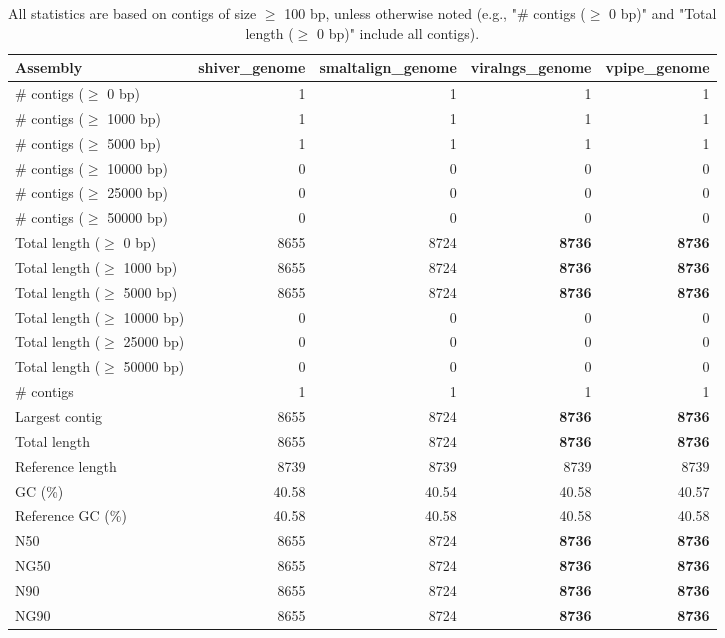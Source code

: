 \documentclass[12pt,a4paper]{article}
\begin{document}
\begin{table}[ht]
\begin{center}
\caption{All statistics are based on contigs of size $\geq$ 100 bp, unless otherwise noted (e.g., "\# contigs ($\geq$ 0 bp)" and "Total length ($\geq$ 0 bp)" include all contigs).}
\begin{tabular}{|l*{4}{|r}|}
\hline
Assembly & shiver\_genome & smaltalign\_genome & viralngs\_genome & vpipe\_genome \\ \hline
\# contigs ($\geq$ 0 bp) & 1 & 1 & 1 & 1 \\ \hline
\# contigs ($\geq$ 1000 bp) & 1 & 1 & 1 & 1 \\ \hline
\# contigs ($\geq$ 5000 bp) & 1 & 1 & 1 & 1 \\ \hline
\# contigs ($\geq$ 10000 bp) & 0 & 0 & 0 & 0 \\ \hline
\# contigs ($\geq$ 25000 bp) & 0 & 0 & 0 & 0 \\ \hline
\# contigs ($\geq$ 50000 bp) & 0 & 0 & 0 & 0 \\ \hline
Total length ($\geq$ 0 bp) & 8655 & 8724 & {\bf 8736} & {\bf 8736} \\ \hline
Total length ($\geq$ 1000 bp) & 8655 & 8724 & {\bf 8736} & {\bf 8736} \\ \hline
Total length ($\geq$ 5000 bp) & 8655 & 8724 & {\bf 8736} & {\bf 8736} \\ \hline
Total length ($\geq$ 10000 bp) & 0 & 0 & 0 & 0 \\ \hline
Total length ($\geq$ 25000 bp) & 0 & 0 & 0 & 0 \\ \hline
Total length ($\geq$ 50000 bp) & 0 & 0 & 0 & 0 \\ \hline
\# contigs & 1 & 1 & 1 & 1 \\ \hline
Largest contig & 8655 & 8724 & {\bf 8736} & {\bf 8736} \\ \hline
Total length & 8655 & 8724 & {\bf 8736} & {\bf 8736} \\ \hline
Reference length & 8739 & 8739 & 8739 & 8739 \\ \hline
GC (\%) & 40.58 & 40.54 & 40.58 & 40.57 \\ \hline
Reference GC (\%) & 40.58 & 40.58 & 40.58 & 40.58 \\ \hline
N50 & 8655 & 8724 & {\bf 8736} & {\bf 8736} \\ \hline
NG50 & 8655 & 8724 & {\bf 8736} & {\bf 8736} \\ \hline
N90 & 8655 & 8724 & {\bf 8736} & {\bf 8736} \\ \hline
NG90 & 8655 & 8724 & {\bf 8736} & {\bf 8736} \\ \hline

\end{tabular}
\end{center}
\end{table}
\end{document}
